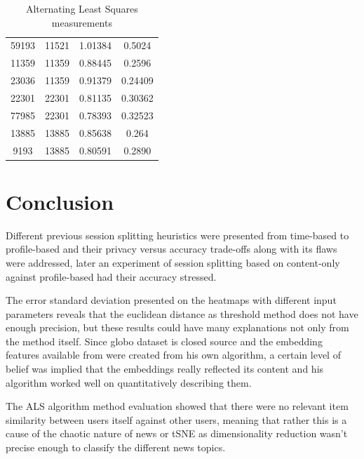\documentclass[ecp,tc,english]{iiufrgs}
\begin{document}
\begin{table}[H]
\begin{tabular}{ |c|c|c|c| }
                59193 & 11521 & 1.01384 & 0.5024 \\
                11359 & 11359 & 0.88445 & 0.2596 \\
                23036 & 11359 & 0.91379 & 0.24409 \\
                \rowcolor[RGB]{220,220,220}                
                22301 & 22301 & 0.81135 & 0.30362 \\
                \rowcolor[RGB]{220,220,220}                
                77985 & 22301 & 0.78393 & 0.32523 \\
                13885 & 13885 & 0.85638 & 0.264 \\
                9193 & 13885 & 0.80591 & 0.2890 \\
                \hline
            \end{tabular}
            \caption{Alternating Least Squares measurements}
            \label{tab:alternate_least_squares_metrics}
        \end{table}


\chapter{Conclusion}
Different previous session splitting heuristics were presented from time-based to profile-based and their privacy versus accuracy trade-offs along with its flaws were addressed, later an experiment of session splitting based on content-only against profile-based had their accuracy stressed.

The error standard deviation presented on the heatmaps with different input parameters reveals that the euclidean distance as threshold method does not have enough precision, but these results could have many explanations not only from the method itself. Since globo dataset is closed source and the embedding features available from \cite{moreira2018chameleon} were created from his own algorithm, a certain level of belief was implied that the embeddings really reflected its content and his algorithm worked well on quantitatively describing them.

The ALS algorithm method evaluation showed that there were no relevant item similarity between users itself against other users, meaning that rather this is a cause of the chaotic nature of news or tSNE as dimensionality reduction wasn't precise enough to classify the different news topics.
\end{document}
